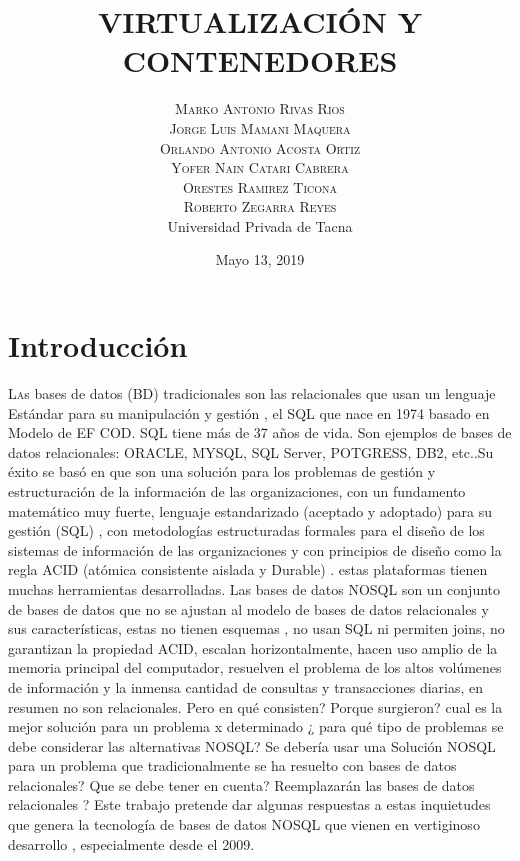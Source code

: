 \documentclass[twoside,twocolumn]{article}
\title{VIRTUALIZACIÓN Y CONTENEDORES} %
\author{%
\textsc{Marko Antonio Rivas Rios} \\[1ex] %
\textsc{Jorge Luis Mamani Maquera} \\[1.01ex] %
\textsc{Orlando Antonio Acosta Ortiz} \\[1.02ex] %
\textsc{Yofer Nain Catari Cabrera} \\[1.03ex] %
\textsc{Orestes Ramirez Ticona} \\[1.04ex] %
\textsc{Roberto Zegarra Reyes} \\[1.05ex] %
\normalsize Universidad Privada de Tacna \\  %
\normalsize {} %
}
\date{Mayo 13, 2019} %
\begin{document}
\maketitle


\section{Introducción}

\lettrine[nindent=0em,lines=2]{L}as bases de datos (BD) tradicionales son las relacionales que usan un lenguaje Estándar para su manipulación y gestión , el SQL que nace en 1974 basado en Modelo de EF COD. SQL tiene más de 37 años de vida. Son ejemplos de bases de datos relacionales: ORACLE, MYSQL, SQL Server, POTGRESS, DB2, etc..Su éxito se basó en que son una solución para los problemas de gestión y estructuración  de la información  de las organizaciones, con un fundamento matemático muy fuerte, lenguaje estandarizado (aceptado y adoptado)  para su gestión (SQL) , con metodologías estructuradas formales para el diseño de los sistemas de información de las organizaciones y con principios de diseño  como la regla ACID (atómica consistente aislada y Durable) . estas plataformas tienen muchas herramientas desarrolladas.
Las bases de datos NOSQL son un conjunto de bases de datos que no se ajustan al modelo de bases de datos relacionales y sus características, estas no tienen esquemas  , no usan SQL ni permiten joins, no garantizan la propiedad ACID,  escalan horizontalmente, hacen uso amplio de la memoria principal del computador, resuelven el problema de los altos volúmenes de información y la inmensa cantidad de consultas y transacciones diarias, en resumen no son relacionales.
Pero en qué consisten? Porque surgieron? cual es la mejor solución para un problema x determinado ¿ para qué tipo de problemas se debe considerar las alternativas NOSQL? Se debería usar una Solución NOSQL para un problema que tradicionalmente se ha resuelto con bases de datos relacionales? Que se debe tener en cuenta? Reemplazarán las bases de datos relacionales ?
Este trabajo pretende dar algunas respuestas a estas inquietudes que genera la tecnología de bases de datos NOSQL que vienen en vertiginoso desarrollo , especialmente desde el 2009.
\end{document}
